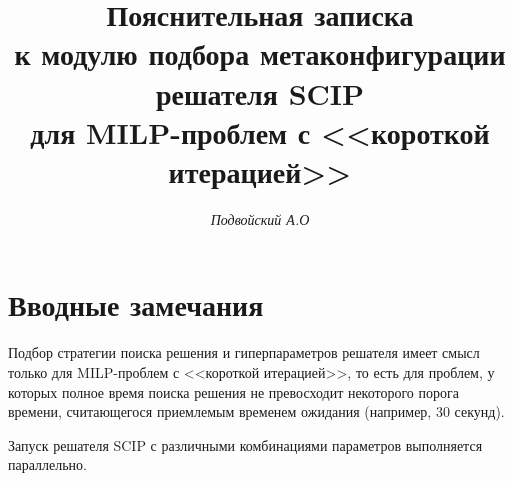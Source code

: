 \documentclass[%
	11pt,
	a4paper,
	utf8,
		]{article}
\begin{document}
\title{Пояснительная записка\\{\large к модулю подбора метаконфигурации решателя SCIP \\для MILP-проблем с <<короткой итерацией>>}}

\author{\itshape Подвойский А.О}


\date{}
\maketitle

\thispagestyle{fancy}



\tableofcontents

\section{Вводные замечания}

Подбор стратегии поиска решения и гиперпараметров решателя имеет смысл только для MILP-проблем с <<короткой итерацией>>, то есть для проблем, у которых полное время поиска решения не превосходит некоторого порога времени, считающегося приемлемым временем ожидания (например, 30 секунд).

Запуск решателя SCIP с различными комбинациями параметров выполняется параллельно. 
\end{document}
